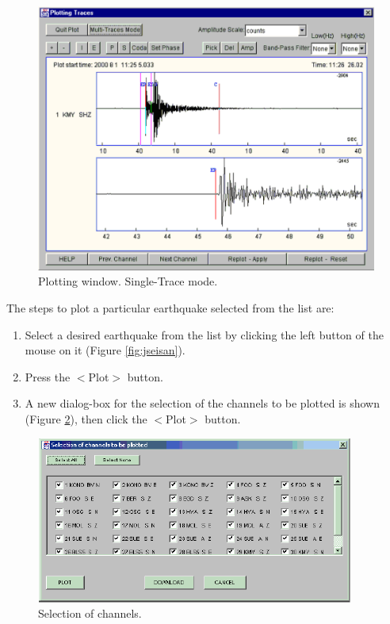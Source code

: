 \begin{figure}
\centerline{\includegraphics[width=0.9\linewidth]{fig/fig10}}
\caption{ Plotting window. Single-Trace mode.}
\label{fig:jseisan-Single-Trace-mode}
\end{figure}

The steps to plot a particular earthquake selected from the list are: 
\begin{enumerate}
\item Select a desired earthquake from the list by clicking the left button of the mouse on it (Figure \ref{fig:jseisan}). 
\item Press the $<$Plot$>$ button. 
\item A new dialog-box for the selection of the channels to be plotted is shown (Figure \ref{fig:jseisan-Selection-of-channels}), then click the $<$Plot$>$ button. 
\end{enumerate}

\begin{figure}
\centerline{\includegraphics[width=0.9\linewidth]{fig/fig11}}
\caption{Selection of channels.}
\label{fig:jseisan-Selection-of-channels}
\end{figure}

